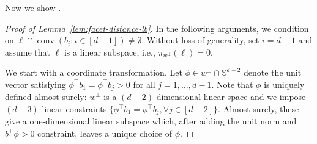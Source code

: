 \documentclass{article}\usepackage[a4paper,margin=20mm]{geometry}
\newcommand{\T}{\top}
\newcommand{\conv}{\operatorname{conv}}
\begin{document}
Now we show .
\begin{proof}[Proof of Lemma~\ref{lem:facet-distance-lb}]\label{sec:proof-facet-distance-lb}
In the following arguments, we condition on $\ell \cap \conv(b_i : i\in [d-1]) \neq \emptyset$.
Without loss of generality, set $i = d-1$ and assume that $\ell$
is a linear subspace, i.e., $\pi_{w^\perp}(\ell)=0$.

We start with a coordinate transformation.
Let $\phi \in w^\perp \cap \mathbb S ^{d-2}$ denote the unit vector
satisfying $\phi^\T b_1 = \phi^\T b_j > 0$ for all $j = 1,\dots,d-1$.
Note that $\phi$ is uniquely defined almost surely: $w^\perp$ is a $(d-2)$-dimensional linear space
and we impose $(d-3)$ linear constraints $\{\phi^\top b_1 = \phi^\top b_j, \forall j \in [d-2] \}$.
Almost surely, these give a one-dimensional linear subspace which,
after adding the unit norm and $b_1^\T \phi > 0$ constraint, leaves a unique choice of $\phi$.


\end{proof}
\end{document}
